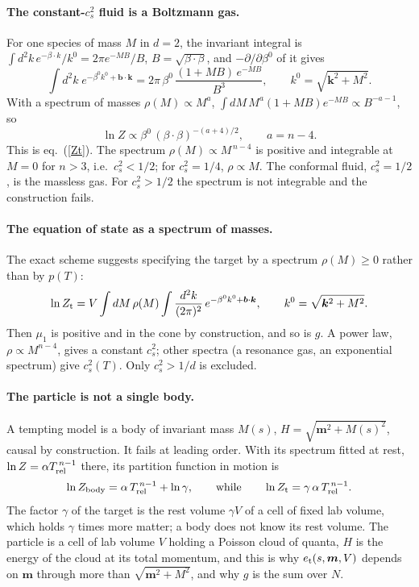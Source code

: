 \documentclass[11pt,aps,preprint,nofootinbib,superscriptaddress,tightenlines]{revtex4-2}
\def\st{\begin{equation}}
\def\stp{\end{equation}}
\def\Eq#1{eq.~(\ref{#1})}
\let\oldparagraph\paragraph
\renewcommand{\paragraph}{\par\bigskip\oldparagraph}
\begin{document}
\paragraph{The constant-$c_s^2$ fluid is a Boltzmann gas.}  For one species of mass $M$ in $d=2$, the invariant integral is
$\int d^2k\,e^{-\beta\cdot k}/k^0=2\pi e^{-MB}/B$, $B=\sqrt{\beta\cdot\beta}$, and $-\partial/\partial\beta^0$ of it gives
\st
\int d^2k\;e^{-\beta^0k^0+\bm b\cdot\bm k}=2\pi\,\beta^0\,\frac{(1+MB)\,e^{-MB}}{B^3},\qquad k^0=\sqrt{\bm k^2+M^2}.
\stp
With a spectrum of masses $\rho(M)\propto M^{a}$, $\int dM\,M^a(1+MB)e^{-MB}\propto B^{-a-1}$, so
\st
\ln Z\propto\beta^0\,(\beta\cdot\beta)^{-(a+4)/2},\qquad a=n-4 .
\stp
This is \Eq{Zt}.  The spectrum $\rho(M)\propto M^{\,n-4}$ is positive and integrable at $M=0$ for $n>3$, i.e.\ $c_s^2<1/2$; for $c_s^2=1/4$,
$\rho\propto M$.  The conformal fluid, $c_s^2=1/2$, is the massless gas.  For $c_s^2>1/2$ the spectrum is not integrable and the construction fails.

\paragraph{The equation of state as a spectrum of masses.}  The exact scheme suggests specifying the target by a spectrum $\rho(M)\ge0$ rather
than by $p(T)$:
\st
\ln Z_{\rm t}=V\int dM\,\rho(M)\int\frac{d^2k}{(2\pi)^2}\,e^{-\beta^0k^0+\bm b\cdot\bm k},\qquad k^0=\sqrt{\bm k^2+M^2} .
\label{Zrho}
\stp
Then $\mu_1$ is positive and in the cone by construction, and so is $g$.  A power law, $\rho\propto M^{n-4}$, gives a constant $c_s^2$; other
spectra (a resonance gas, an exponential spectrum) give $c_s^2(T)$.  Only $c_s^2>1/d$ is excluded.

\paragraph{The particle is not a single body.}  A tempting model is a body of invariant mass $M(s)$, $H=\sqrt{\bm m^2+M(s)^2}$, causal by
construction.  It fails at leading order.  With its spectrum fitted at rest, $\ln Z=\alpha T_{\rm rel}^{\,n-1}$ there, its partition function in
motion is
\st
\ln Z_{\rm body}=\alpha\,T_{\rm rel}^{\,n-1}+\ln\gamma,\qquad\text{while}\qquad \ln Z_{\rm t}=\gamma\,\alpha\,T_{\rm rel}^{\,n-1} .
\stp
The factor $\gamma$ of the target is the rest volume $\gamma V$ of a cell of fixed lab volume, which holds $\gamma$ times more matter; a body does
not know its rest volume.  The particle is a cell of lab volume $V$ holding a Poisson cloud of quanta, $H$ is the energy of the cloud at its total
momentum, and this is why $e_{\rm t}(s,\bm m,V)$ depends on $\bm m$ through more than $\sqrt{\bm m^2+M^2}$, and why $g$ is the sum over $N$.
\end{document}
